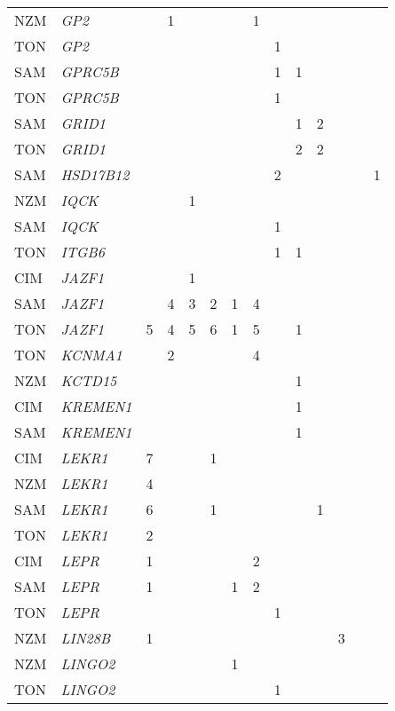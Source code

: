 \documentclass[]{report}
\begin{document}
\begin{ThreePartTable}
\begin{longtable}[t]{llllllllllllll}
NZM & \em{GP2} &  & 1 &  &  &  & 1 &  &  &  &  &  & \\
TON & \em{GP2} &  &  &  &  &  &  & 1 &  &  &  &  & \\
SAM & \em{GPRC5B} &  &  &  &  &  &  & 1 & 1 &  &  &  & \\
TON & \em{GPRC5B} &  &  &  &  &  &  & 1 &  &  &  &  & \\
SAM & \em{GRID1} &  &  &  &  &  &  &  & 1 & 2 &  &  & \\
TON & \em{GRID1} &  &  &  &  &  &  &  & 2 & 2 &  &  & \\
SAM & \em{HSD17B12} &  &  &  &  &  &  & 2 &  &  &  &  & 1\\
NZM & \em{IQCK} &  &  & 1 &  &  &  &  &  &  &  &  & \\
SAM & \em{IQCK} &  &  &  &  &  &  & 1 &  &  &  &  & \\
TON & \em{ITGB6} &  &  &  &  &  &  & 1 & 1 &  &  &  & \\
CIM & \em{JAZF1} &  &  & 1 &  &  &  &  &  &  &  &  & \\
SAM & \em{JAZF1} &  & 4 & 3 & 2 & 1 & 4 &  &  &  &  &  & \\
TON & \em{JAZF1} & 5 & 4 & 5 & 6 & 1 & 5 &  & 1 &  &  &  & \\
TON & \em{KCNMA1} &  & 2 &  &  &  & 4 &  &  &  &  &  & \\
NZM & \em{KCTD15} &  &  &  &  &  &  &  & 1 &  &  &  & \\
CIM & \em{KREMEN1} &  &  &  &  &  &  &  & 1 &  &  &  & \\
SAM & \em{KREMEN1} &  &  &  &  &  &  &  & 1 &  &  &  & \\
CIM & \em{LEKR1} & 7 &  &  & 1 &  &  &  &  &  &  &  & \\
NZM & \em{LEKR1} & 4 &  &  &  &  &  &  &  &  &  &  & \\
SAM & \em{LEKR1} & 6 &  &  & 1 &  &  &  &  & 1 &  &  & \\
TON & \em{LEKR1} & 2 &  &  &  &  &  &  &  &  &  &  & \\
CIM & \em{LEPR} & 1 &  &  &  &  & 2 &  &  &  &  &  & \\
SAM & \em{LEPR} & 1 &  &  &  & 1 & 2 &  &  &  &  &  & \\
TON & \em{LEPR} &  &  &  &  &  &  & 1 &  &  &  &  & \\
NZM & \em{LIN28B} & 1 &  &  &  &  &  &  &  &  & 3 &  & \\
NZM & \em{LINGO2} &  &  &  &  & 1 &  &  &  &  &  &  & \\
TON & \em{LINGO2} &  &  &  &  &  &  & 1 &  &  &  &  & \\

\end{longtable}
\end{ThreePartTable}
\end{document}
